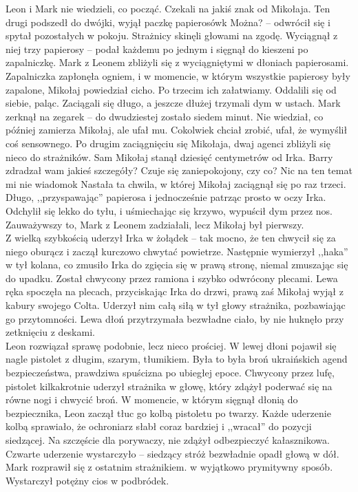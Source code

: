 \documentclass[../MAIN.tex]{subfiles}
\begin{document}
Leon i Mark nie wiedzieli, co począć. Czekali na jakiś znak od Mikołaja. Ten drugi podszedł do dwójki, wyjął paczkę papierosów\3k
\sx Można? -- odwrócił się i spytał pozostałych w pokoju. \qd
Strażnicy skinęli głowami na zgodę.
Wyciągnął z niej trzy papierosy -- podał każdemu po jednym i sięgnął do kieszeni po zapalniczkę. Mark z Leonem zbliżyli się z wyciągniętymi w dłoniach papierosami. Zapalniczka zapłonęła ogniem, i w momencie, w którym wszystkie papierosy były zapalone, Mikołaj powiedział cicho.
\sx Po trzecim ich załatwiamy. \qd
Oddalili się od siebie, paląc. Zaciągali się długo, a jeszcze dłużej trzymali dym w ustach. Mark zerknął na zegarek -- do dwudziestej zostało siedem minut. Nie wiedział, co później zamierza Mikołaj, ale ufał mu. Cokolwiek chciał zrobić, ufał, że wymyślił coś sensownego. Po drugim zaciągnięciu się Mikołaja, dwaj agenci zbliżyli się nieco do strażników. Sam Mikołaj stanął dziesięć centymetrów od Irka.
\sx Barry zdradzał wam jakieś szczegóły? Czuje się zaniepokojony, czy co?
\xx Nic na ten temat mi nie wiadomo\3k
\qd
Nastała ta chwila, w której Mikołaj zaciągnął się po raz trzeci. Długo, ,,przyspawając'' papierosa i jednocześnie patrząc prosto w oczy Irka. Odchylił się lekko do tyłu, i uśmiechając się krzywo, wypuścił dym przez nos. Zauważywszy to, Mark z Leonem zadziałali, lecz Mikołaj był pierwszy. \\
Z wielką szybkością uderzył Irka w żołądek -- tak mocno, że ten chwycił się za niego oburącz i zaczął kurczowo chwytać powietrze. Następnie wymierzył ,,haka'' w tył kolana, co zmusiło Irka do zgięcia się w prawą stronę, niemal zmuszając się do upadku. Został chwycony przez ramiona i szybko odwrócony plecami. Lewa ręka spoczęła na plecach, przyciskając Irka do drzwi, prawą zaś Mikołaj wyjął z kabury swojego Colta. Uderzył nim całą siłą w tył głowy strażnika, pozbawiając go przytomności. Lewa dłoń przytrzymała bezwładne ciało, by nie huknęło przy zetknięciu z deskami. \\
Leon rozwiązał sprawę podobnie, lecz nieco prościej. W lewej dłoni pojawił się nagle pistolet z długim, szarym, tłumikiem. Była to była broń ukraińskich agend bezpieczeństwa, prawdziwa spuścizna po ubiegłej epoce. Chwycony przez lufę, pistolet kilkakrotnie uderzył strażnika w głowę, który zdążył poderwać się na równe nogi i chwycić broń. W momencie, w którym sięgnął dłonią do bezpiecznika, Leon zaczął tłuc go kolbą pistoletu po twarzy. Każde uderzenie kolbą sprawiało, że ochroniarz słabł coraz bardziej i ,,wracał'' do pozycji siedzącej. Na szczęście dla porywaczy, nie zdążył odbezpieczyć kałasznikowa. Czwarte uderzenie wystarczyło -- siedzący stróż bezwładnie opadł głową w dół. Mark rozprawił się z ostatnim strażnikiem. w wyjątkowo prymitywny sposób. Wystarczył potężny cios w podbródek. \\
\end{document}
